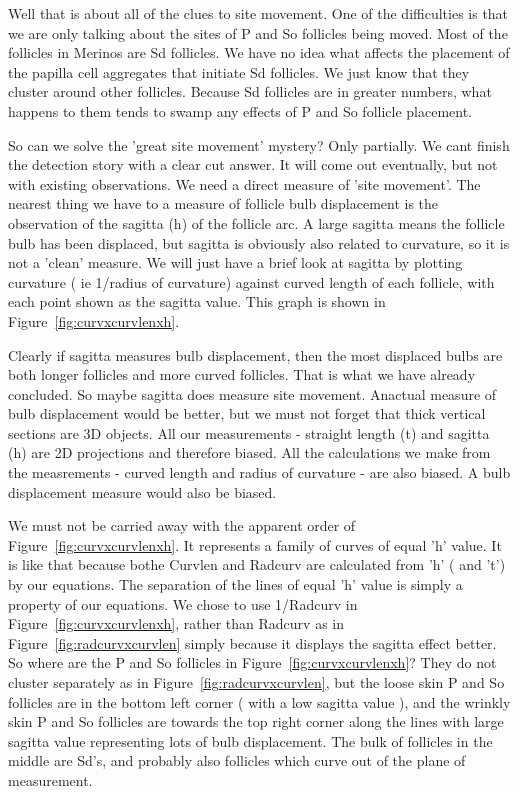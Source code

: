 \documentclass[titlepage]{article}  %
\begin{document}
Well that is about all of the clues to site movement. One of the difficulties is that we are only talking about the sites of P and So follicles being moved. Most of the follicles in Merinos are Sd follicles. We have no idea what affects the placement of the papilla cell aggregates that initiate Sd follicles. We just know that they cluster around other follicles. Because Sd follicles are in greater numbers, what happens to them tends to swamp any effects of P and So follicle placement. 

So can we solve the 'great site movement' mystery? Only partially. We cant finish the detection story with a clear cut answer. It will come out eventually, but not with existing observations. We need a direct measure of 'site movement'. The nearest thing we have to a measure of follicle bulb displacement is the observation of the sagitta (h) of the follicle arc. A large sagitta means the follicle bulb has been displaced, but sagitta is obviously also related to curvature, so it is not a 'clean' measure.  We will just have a brief look at sagitta by plotting curvature ( ie 1/radius of curvature) against curved length of each follicle, with each point shown as the sagitta value. This graph is shown in Figure~\ref{fig:curvxcurvlenxh}.

 Clearly if sagitta measures bulb displacement, then the most displaced bulbs are both longer follicles and more curved follicles. That is what we have already concluded. So maybe sagitta does measure site movement.  Anactual measure of bulb displacement would be better, but we must not forget that thick vertical sections are 3D objects. All our measurements - straight length (t) and sagitta (h) are 2D projections and therefore biased. All the calculations we make from the measrements - curved length and radius of curvature - are also biased. A bulb displacement measure would also be biased. 

We must not be carried away with the apparent order of Figure~\ref{fig:curvxcurvlenxh}. It represents a family of curves of equal 'h' value. It is like that because bothe Curvlen and Radcurv are calculated from 'h' ( and 't') by our equations. The separation of the lines of equal 'h' value is simply a property of our equations. We chose to use 1/Radcurv in Figure~\ref{fig:curvxcurvlenxh}, rather than Radcurv as in Figure~\ref{fig:radcurvxcurvlen} simply because it displays the sagitta effect better. So where are the P and So follicles in Figure~\ref{fig:curvxcurvlenxh}? They do not cluster separately as in Figure~\ref{fig:radcurvxcurvlen}, but the loose skin P and So follicles are in the bottom left corner ( with a low sagitta value ), and the wrinkly skin P and So follicles are towards the top right corner along the lines with large sagitta value representing lots of bulb displacement. The bulk of follicles in the middle are Sd's, and probably also follicles which curve out of the plane of measurement.
\end{document}
